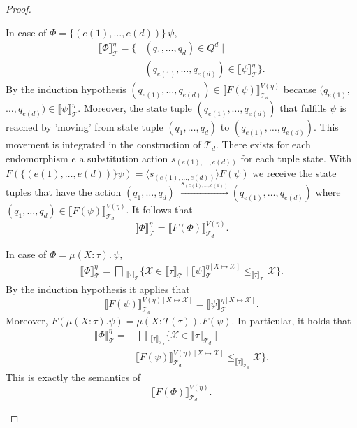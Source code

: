 \begin{proof}
\begin{compactitem}
        \item In case of $\Phi = \{(e(1), \dots, e(d))\}\,\psi$, 
        \begin{align*}
            \llbracket \Phi \rrbracket^\eta_\mathcal{T} = \{&(q_1, \dots,
            q_d) \in Q^d \mid \\&(q_{e(1)}, \dots, q_{e(d)}) \in \llbracket \psi
            \rrbracket ^\eta_\mathcal{T}\}.
        \end{align*}
        By the induction hypothesis $({q_{e(1)}}, \dots, {q_{e(d)}}) \in \llbracket F(\psi) \rrbracket^{V(\eta)}_{\mathcal{T}_d}$ because $({q_{e(1)}},$ $ \dots, {q_{e(d)}}) \in
        \llbracket \psi \rrbracket^\eta_\mathcal{T}$.
        Moreover, the state tuple $({q_{e(1)}}, \dots, {q_{e(d)}})$ that fulfills $\psi$ is reached by 'moving' from
        state tuple $({q_{1}}, \dots, {q_{d}})$ to $({q_{e(1)}}, \dots, {q_{e(d)}})$. This movement is
        integrated in the construction of $\mathcal{T}_d$. There exists for each endomorphism $e$ a
        substitution action $s_{(e(1), \dots, e(d))}$ for each tuple state. With $F(\{(e(1), \dots, e(d))\}
        \psi) = \langle s_{(e(1), \dots, e(d))} \rangle F(\psi)$ we receive the state tuples that have the action $(q_1,
        \dots, q_d)$ $ \overset{s_{(e(1), \dots, e(d))}}{\rightarrow} (q_{e
        (1)}, \dots, q_{e(d)})$ where $(q_1, \dots, q_d) \in \llbracket F(\psi) \rrbracket^{V(\eta)}_{\mathcal{T}_d}$.
        It follows that
        \[\llbracket \Phi \rrbracket^\eta_\mathcal{T} = \llbracket F(\Phi) \rrbracket^{V(\eta)}_{\mathcal{T}_d}.\]

        \item In case of $\Phi = \mu(X \colon \tau).\,\psi$,
        \begin{align*}
            \llbracket \Phi \rrbracket^\eta_\mathcal{T} =\bigsqcap\,
            _{\llbracket\tau\rrbracket_\mathcal{T}} \{\mathcal{X} \in \llbracket \tau \rrbracket_\mathcal{T}
            \mid 
            \llbracket \psi \rrbracket^{\eta[X \mapsto
            \mathcal{X}]}_\mathcal{T}
            \leq_{\llbracket \tau \rrbracket_\mathcal{T}} \mathcal{X}\}.
        \end{align*}
        By the induction hypothesis it applies that 
        \[\llbracket F(\psi) \rrbracket^{V(\eta)[X \mapsto \mathcal{X}]}_{\mathcal{T}_d} = \llbracket 
        \psi \rrbracket^{\eta[X \mapsto \mathcal{X}]}_\mathcal{T}.\]
        Moreover, $F(\mu(X \colon \tau).\psi) = \mu(X \colon T(\tau)).F(\psi)$. In particular, it holds that
        \begin{align*}
            \llbracket \Phi \rrbracket^\eta_\mathcal{T} =&\,\bigsqcap\,
            _{\llbracket\tau\rrbracket_{\mathcal{T}_d}} \{\mathcal{X} \in \llbracket \tau \rrbracket_{\mathcal{T}_d}
            \mid \\
            &\llbracket F(\psi) \rrbracket^{V(\eta)[X \mapsto
            \mathcal{X}]}_{\mathcal{T}_d}
            \leq_{\llbracket \tau \rrbracket_{\mathcal{T}_d}} \mathcal{X}\}.
        \end{align*}
        This is exactly the semantics of
        \[\llbracket F(\Phi) \rrbracket^{V(\eta)}_{\mathcal{T}_d}.\]


\end{compactitem}
\end{proof}
